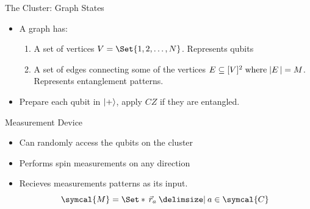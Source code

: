 \begin{frame}{The Cluster: Graph States}
    \centering
    \begin{minipage}{0.3\linewidth}
    \end{minipage}
    \hspace{0.10\linewidth}
    \begin{minipage}{0.45\linewidth}
        \begin{itemize}
            \item<1-> A graph has: \begin{enumerate}
                \item A set of vertices \(V = \Set{1, 2, \dots, N}\). Represents qubits
                \item A set of edges connecting some of the vertices \(E \subseteq [V]^2 \;\text{where}\; \lvert E\,\rvert = M\). Represents entanglement patterns.
            \end{enumerate}
            \item<2-> Prepare each qubit in \(\lvert+\rangle\), apply \(CZ\) if they are entangled.
        \end{itemize}
    \end{minipage}
\end{frame}

\begin{frame}{Measurement Device}   
    \begin{itemize}
    \item Can randomly access the qubits on the cluster
    \item Performs spin measurements on any direction
    \item Recieves measurements patterns as its input.\[\symcal{M} = \Set*{\,\vec{r}_a \given a \in \symcal{C}\,}\]
    \end{itemize} 
\end{frame}

